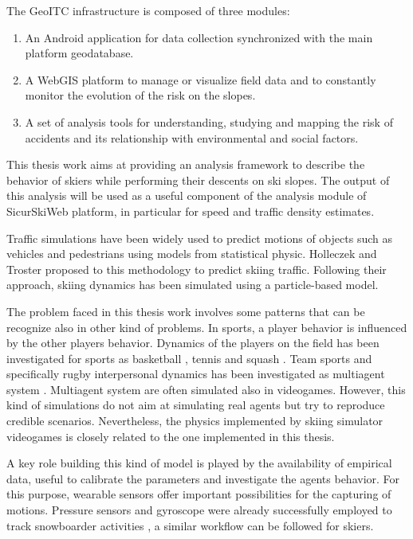 \documentclass[12pt,a4paper,twoside]{book}
\begin{document}
The GeoITC infrastructure is composed of three modules:
\begin{enumerate}
\item An Android application for data collection synchronized with the main platform geodatabase.
\item A WebGIS platform to manage or visualize field data and to constantly monitor the evolution of the risk on the slopes.
\item A set of analysis tools for understanding, studying and mapping the risk of accidents and its relationship with environmental and social factors.
\end{enumerate}
This thesis work aims at providing an analysis framework to describe the behavior of skiers while performing their descents on ski slopes. The output of this analysis will be used as a useful component of the analysis module of SicurSkiWeb platform, in particular for speed and traffic density estimates.

Traffic simulations have been widely used to predict motions of objects such as vehicles and pedestrians using models from statistical physic. Holleczek and Troster proposed to this methodology to predict skiing traffic. Following their approach, skiing dynamics has been simulated using a particle-based model.

The problem faced in this thesis work involves some patterns that can be recognize also in other kind of problems. In sports, a player behavior is influenced by the other players behavior. Dynamics of the players on the field has been investigated for sports as basketball \cite{bo2010}, tennis \cite{pa2005} and squash \cite{mc2006}. Team sports and specifically rugby interpersonal dynamics has been investigated as multiagent system \cite{qu2009}. Multiagent system are often simulated also in videogames. However, this kind of simulations do not aim at simulating real agents but try to reproduce credible scenarios. Nevertheless, the physics implemented by skiing simulator videogames is closely related to the one implemented in this thesis.

A key role building this kind of model is played by the availability of empirical data, useful to calibrate the parameters and investigate the agents behavior. For this purpose, wearable sensors offer important possibilities for the capturing of motions. Pressure sensors and gyroscope were already successfully employed to track snowboarder activities \cite{hol2010}, a similar workflow can be followed for skiers.
\end{document}
